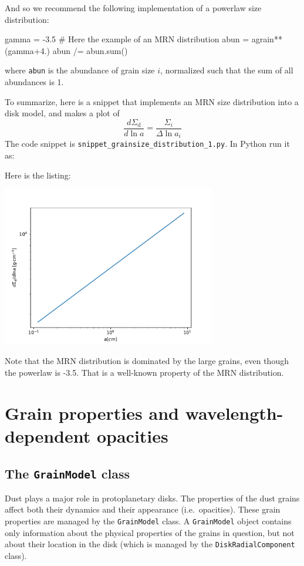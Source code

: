 \documentclass{book}
\newcommand{\code}[1]{{\small\tt #1}}
\begin{document}
And so we recommend the following implementation of a powerlaw size distribution:
\begin{codebox}
gamma   = -3.5    # Here the example of an MRN distribution
abun    = agrain**(gamma+4.)
abun   /= abun.sum()
\end{codebox}
where \code{abun} is the abundance of grain size $i$, normalized such that
the sum of all abundances is 1.

To summarize, here is a snippet that implements an MRN size distribution
into a disk model, and makes a plot of
\begin{equation}
\frac{d\Sigma_{\mathrm{d}}}{d\ln a} = \frac{\Sigma_i}{\Delta \ln a_i}
\end{equation}
The code snippet is
\code{snippet\_grainsize\_distribution\_1.py}. In Python run it as:
\begin{codebox}
\end{codebox}
Here is the listing:

\centerline{\includegraphics[width=0.7\textwidth]{../snippets/fig_snippet_grainsize_distribution_1_1.pdf}}

Note that the MRN distribution is dominated by the large grains, even though the
powerlaw is -3.5. That is a well-known property of the MRN distribution.


\chapter{Grain properties and wavelength-dependent opacities}
\label{chap-grain-model}
%
\section{The {\tt GrainModel} class}
\label{sec-grainmodel-class}
%
Dust plays a major role in protoplanetary disks. The properties of the dust
grains affect both their dynamics and their appearance (i.e.~opacities). These
grain properties are managed by the \code{GrainModel} class. A \code{GrainModel}
object contains only information about the physical properties of the grains in
question, but not about their location in the disk (which is managed by the
\code{DiskRadialComponent} class).
\end{document}

